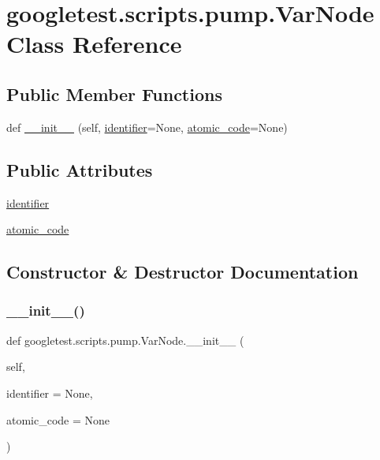 \hypertarget{classgoogletest_1_1scripts_1_1pump_1_1_var_node}{}\section{googletest.\+scripts.\+pump.\+Var\+Node Class Reference}
\label{classgoogletest_1_1scripts_1_1pump_1_1_var_node}
\subsection*{Public Member Functions}
\begin{DoxyCompactItemize}
\item 
def \mbox{\hyperlink{classgoogletest_1_1scripts_1_1pump_1_1_var_node_a60f6a091022cccfb404b4f09aac6d9a1}{\+\_\+\+\_\+init\+\_\+\+\_\+}} (self, \mbox{\hyperlink{classgoogletest_1_1scripts_1_1pump_1_1_var_node_a482b5988b73eafee2a0e6994c7415c98}{identifier}}=None, \mbox{\hyperlink{classgoogletest_1_1scripts_1_1pump_1_1_var_node_a38d773bd8c03423d0b28ccfda481f64d}{atomic\+\_\+code}}=None)
\end{DoxyCompactItemize}
\subsection*{Public Attributes}
\begin{DoxyCompactItemize}
\item 
\mbox{\hyperlink{classgoogletest_1_1scripts_1_1pump_1_1_var_node_a482b5988b73eafee2a0e6994c7415c98}{identifier}}
\item 
\mbox{\hyperlink{classgoogletest_1_1scripts_1_1pump_1_1_var_node_a38d773bd8c03423d0b28ccfda481f64d}{atomic\+\_\+code}}
\end{DoxyCompactItemize}


\subsection{Constructor \& Destructor Documentation}
\mbox{\label{classgoogletest_1_1scripts_1_1pump_1_1_var_node_a60f6a091022cccfb404b4f09aac6d9a1}} 
\subsubsection{\texorpdfstring{\_\_init\_\_()}{\_\_init\_\_()}}
{\footnotesize\ttfamily def googletest.\+scripts.\+pump.\+Var\+Node.\+\_\+\+\_\+init\+\_\+\+\_\+ (\begin{DoxyParamCaption}\item[{}]{self,  }\item[{}]{identifier = {\ttfamily None},  }\item[{}]{atomic\+\_\+code = {\ttfamily None} }\end{DoxyParamCaption})}



